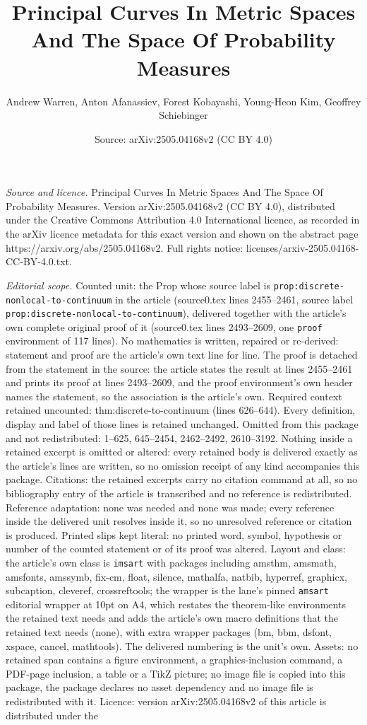 \documentclass[10pt,a4paper]{amsart}
\title[Principal Curves In Metric Spaces And The Space Of Probabili]{Principal Curves In Metric Spaces And The Space Of Probability Measures}
\author{Andrew Warren, Anton Afanassiev, Forest Kobayashi, Young-Heon Kim, Geoffrey Schiebinger}
\date{Source: arXiv:2505.04168v2 (CC BY 4.0)}
\begin{document}
\maketitle

\noindent\emph{Source and licence.} Principal Curves In Metric Spaces And The Space Of Probability Measures. Version arXiv:2505.04168v2 (CC BY 4.0), distributed under the Creative Commons Attribution 4.0 International licence, as recorded in the arXiv licence metadata for this exact version and shown on the abstract page https://arxiv.org/abs/2505.04168v2. Full rights notice: licenses/arxiv-2505.04168-CC-BY-4.0.txt.\par\smallskip

\noindent\textit{Editorial scope.} Counted unit: the Prop whose source label is \texttt{prop:discrete-nonlocal-to-continuum} in the article (source0.tex lines 2455--2461, source label \texttt{prop:discrete-nonlocal-to-continuum}), delivered together with the article's own complete original proof of it (source0.tex lines 2493--2609, one \texttt{proof} environment of 117 lines). No mathematics is written, repaired or re-derived: statement and proof are the article's own text line for line. The proof is detached from the statement in the source: the article states the result at lines 2455--2461 and prints its proof at lines 2493--2609, and the proof environment's own header names the statement, so the association is the article's own. Required context retained uncounted: thm:discrete-to-continuum (lines 626--644). Every definition, display and label of those lines is retained unchanged. Omitted from this package and not redistributed: 1--625, 645--2454, 2462--2492, 2610--3192. Nothing inside a retained excerpt is omitted or altered: every retained body is delivered exactly as the article's lines are written, so no omission receipt of any kind accompanies this package. Citations: the retained excerpts carry no citation command at all, so no bibliography entry of the article is transcribed and no reference is redistributed. Reference adaptation: none was needed and none was made; every reference inside the delivered unit resolves inside it, so no unresolved reference or citation is produced. Printed slips kept literal: no printed word, symbol, hypothesis or number of the counted statement or of its proof was altered. Layout and class: the article's own class is \texttt{imsart} with packages including amsthm, amsmath, amsfonts, amssymb, fix-cm, float, silence, mathalfa, natbib, hyperref, graphicx, subcaption, cleveref, crossreftools; the wrapper is the lane's pinned \texttt{amsart} editorial wrapper at 10pt on A4, which restates the theorem-like environments the retained text needs and adds the article's own macro definitions that the retained text needs (none), with extra wrapper packages (bm, bbm, dsfont, xspace, cancel, mathtools). The delivered numbering is the unit's own. Assets: no retained span contains a figure environment, a graphics-inclusion command, a PDF-page inclusion, a table or a TikZ picture; no image file is copied into this package, the package declares no asset dependency and no image file is redistributed with it. Licence: version arXiv:2505.04168v2 of this article is distributed under the 
\end{document}
